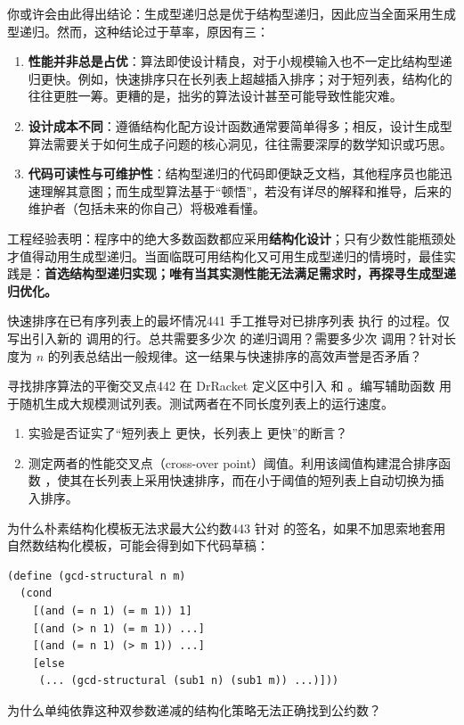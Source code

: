 你或许会由此得出结论：生成型递归总是优于结构型递归，因此应当全面采用生成型递归。然而，这种结论过于草率，原因有三：
\begin{enumerate}
  \item \textbf{性能并非总是占优}：算法即使设计精良，对于小规模输入也不一定比结构型递归更快。例如，快速排序只在长列表上超越插入排序；对于短列表，结构化的  往往更胜一筹。更糟的是，拙劣的算法设计甚至可能导致性能灾难。
  \item \textbf{设计成本不同}：遵循结构化配方设计函数通常要简单得多；相反，设计生成型算法需要关于如何生成子问题的核心洞见，往往需要深厚的数学知识或巧思。
  \item \textbf{代码可读性与可维护性}：结构型递归的代码即便缺乏文档，其他程序员也能迅速理解其意图；而生成型算法基于“顿悟”，若没有详尽的解释和推导，后来的维护者（包括未来的你自己）将极难看懂。
\end{enumerate}

工程经验表明：程序中的绝大多数函数都应采用\textbf{结构化设计}；只有少数性能瓶颈处才值得动用生成型递归。当面临既可用结构化又可用生成型递归的情境时，最佳实践是：\textbf{首选结构型递归实现；唯有当其实测性能无法满足需求时，再探寻生成型递归优化。}

\begin{exercise}{快速排序在已有序列表上的最坏情况}{441}\label{ex:441}
手工推导对已排序列表  执行  的过程。仅写出引入新的  调用的行。总共需要多少次  的递归调用？需要多少次  调用？针对长度为 $n$ 的列表总结出一般规律。这一结果与快速排序的高效声誉是否矛盾？
\end{exercise}

\begin{exercise}{寻找排序算法的平衡交叉点}{442}\label{ex:442}
在 DrRacket 定义区中引入  和 。编写辅助函数  用于随机生成大规模测试列表。测试两者在不同长度列表上的运行速度。
\begin{enumerate}
  \item 实验是否证实了“短列表上  更快，长列表上  更快”的断言？
  \item 测定两者的性能交叉点（cross-over point）阈值。利用该阈值构建混合排序函数 ，使其在长列表上采用快速排序，而在小于阈值的短列表上自动切换为插入排序。
\end{enumerate}
\end{exercise}

\begin{exercise}{为什么朴素结构化模板无法求最大公约数}{443}\label{ex:443}
针对  的签名，如果不加思索地套用自然数结构化模板，可能会得到如下代码草稿：
\begin{lstlisting}[language=BSL]
(define (gcd-structural n m)
  (cond
    [(and (= n 1) (= m 1)) 1]
    [(and (> n 1) (= m 1)) ...]
    [(and (= n 1) (> m 1)) ...]
    [else
     (... (gcd-structural (sub1 n) (sub1 m)) ...)]))
\end{lstlisting}
为什么单纯依靠这种双参数递减的结构化策略无法正确找到公约数？
\end{exercise}

